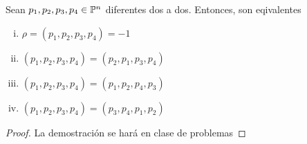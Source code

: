 \begin{prop}\label{prop:intercambio_raz_do}
 Sean $p_1,p_2,p_3,p_4 \in \mathbb{P}^n$ diferentes dos a dos. Entonces, son eqivalentes
 \begin{enumerate}[i)]
  \item $\rho = (p_1,p_2,p_3,p_4) = -1$
  \item $(p_1,p_2,p_3,p_4) = (p_2,p_1,p_3,p_4)$
  \item $(p_1,p_2,p_3,p_4) = (p_1,p_2,p_4,p_3)$
  \item $(p_1,p_2,p_3,p_4) = (p_3,p_4,p_1,p_2)$
 \end{enumerate}
\end{prop}

\begin{proof}
 La demostración se hará en clase de problemas 
\end{proof}

